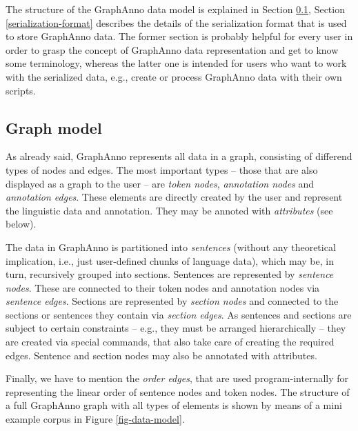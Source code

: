 \documentclass[12pt]{scrartcl}
\begin{document}
The structure of the GraphAnno data model is explained in Section \ref{graph-model}, Section \ref{serialization-format} describes the details of the serialization format that is used to store GraphAnno data.
The former section is probably helpful for every user in order to grasp the concept of GraphAnno data representation and get to know some terminology, whereas the latter one is intended for users who want to work with the serialized data, e.g., create or process GraphAnno data with their own scripts.


\subsection{Graph model}\label{graph-model}

As already said, GraphAnno represents all data in a graph, consisting of differend types of nodes and edges.
The most important types – those that are also displayed as a graph to the user – are \textit{token nodes}, \textit{annotation nodes} and \textit{annotation edges}.
These elements are directly created by the user and represent the linguistic data and annotation.
They may be annoted with \textit{attributes} (see below).

The data in GraphAnno is partitioned into \textit{sentences} (without any theoretical implication, i.e., just user-defined chunks of language data), which may be, in turn, recursively grouped into sections.
Sentences are represented by \textit{sentence nodes}.
These are connected to their token nodes and annotation nodes via \textit{sentence edges}.
Sections are represented by \textit{section nodes} and connected to the sections or sentences they contain via \textit{section edges}.
As sentences and sections are subject to certain constraints – e.g., they must be arranged hierarchically –  they are created via special commands, that also take care of creating the required edges.
Sentence and section nodes may also be annotated with attributes.

Finally, we have to mention the \textit{order edges}, that are used program-internally for representing the linear order of sentence nodes and token nodes.
The structure of a full GraphAnno graph with all types of elements is shown by means of a mini example corpus in Figure \ref{fig-data-model}.
\end{document}
